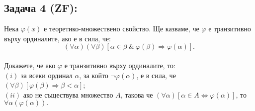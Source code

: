 \documentclass[french]{article}
\begin{document}
	
	\subsection*{Задача 4 (ZF):}
	Нека $\varphi(x)$ е теоретико-множествено свойство. Ще казваме, че $\varphi$ е транзитивно върху ординалите, ако е в сила, че: \\
	$$(\forall \alpha)(\forall \beta)[\alpha \in \beta\ \&\ \varphi(\beta) \Rightarrow \varphi(\alpha)].$$ \\
	Докажете, че ако $\varphi$ е транзитивно върху ординалите, то: \\
	$(i)$ за всеки ординал $\alpha$, за който $\neg \varphi(\alpha)$, е в сила, че $(\forall \beta)[\varphi(\beta) \Rightarrow \beta < \alpha]$; \\
	$(ii)$ ако не съществува множество $A$, такова че $(\forall \alpha)[\alpha \in A \Longleftrightarrow \varphi(\alpha)]$, то $\forall \alpha (\varphi(\alpha)).$ \\
	
\end{document}
